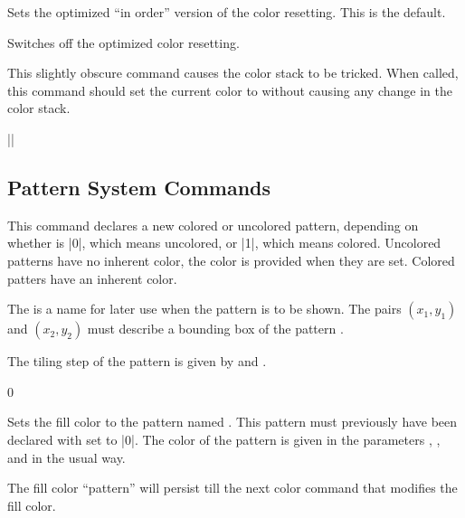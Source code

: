 \begin{command}{\pgfsys@color@reset@inordertrue}
  Sets the optimized ``in order'' version of the color resetting. This
  is the default.
\end{command}

\begin{command}{\pgfsys@color@reset@inorderfalse}
  Switches off the optimized color resetting.
\end{command}

\begin{command}{\pgfsys@color@unstacked{}}
  This slightly obscure command causes the color stack to be
  tricked. When called, this command should set the current color to
   without causing any change in the color stack.

  \example ||
\end{command}




\subsection{Pattern System Commands}


\begin{command}{\pgfsys@declarepattern
    }
  This command declares a new colored or uncolored pattern, depending
  on whether  is |0|, which means uncolored, or |1|, which
  means colored. Uncolored patterns have no inherent color, the color
  is provided when they are set. Colored patters have an inherent
  color.

  The  is a name for later use when the pattern is to be
  shown. The pairs $(x_1,y_1)$ and $(x_2,y_2)$ must describe a
  bounding box of the pattern .

  The tiling step of the pattern is given by  and
  .

  \example
\begin{codeexample}
{\pgfsys@moveto{0pt}{0pt}\pgfsys@lineto{0pt}{3pt}\pgfsys@stroke}
{0}
\end{codeexample}
\end{command}

\begin{command}{\pgfsys@setpatternuncolored{}}
  Sets the fill color to the pattern named . This pattern
  must previously have been declared with  set to |0|. The
  color of the pattern is given in the parameters ,
  , and  in the usual way.

  The fill color ``pattern''  will persist till the next color command
  that modifies the fill color.
\end{command}

